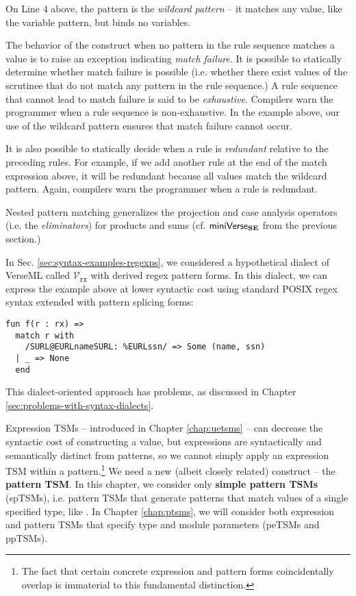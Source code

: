 On Line 4 above, the pattern \li{_} is the \emph{wildcard pattern} -- it matches any value, like the variable pattern, but binds no variables.

The behavior of the  construct when no pattern in the rule sequence matches a value is to raise an exception indicating \emph{match failure}. It is possible to statically determine whether match failure is possible (i.e. whether there exist values of the scrutinee that do not match any pattern in the rule sequence.) A rule sequence that cannot lead to match failure is said to be \emph{exhaustive}. Compilers warn the programmer when a rule sequence is non-exhaustive. In the example above, our use of the wildcard pattern ensures that match failure cannot occur. 

It is also possible to statically decide when a rule is \emph{redundant} relative to the preceding rules. For example, if we add  another rule at the end of the match expression above, it will be redundant because all values match the wildcard pattern. Again, compilers warn the programmer when a rule is redundant.

Nested pattern matching generalizes the projection and case analysis operators (i.e. the \emph{eliminators}) for products and sums (cf. $\mathsf{miniVerse}_\textbf{SE}$ from the previous section.) 

In Sec. \ref{sec:syntax-examples-regexps}, we considered a hypothetical dialect of VerseML called $\mathcal{V}_\texttt{rx}$ with derived regex pattern forms. In this dialect, we can express the example above at lower syntactic cost using standard POSIX regex syntax extended with pattern splicing forms:

\begin{lstlisting}
fun f(r : rx) => 
  match r with 
    /SURL@EURLnameSURL: %EURLssn/ => Some (name, ssn)
  | _ => None
  end
\end{lstlisting}
\noindent
This dialect-oriented approach has problems, as  discussed in Chapter \ref{sec:problems-with-syntax-dialects}.


Expression TSMs -- introduced in Chapter \ref{chap:uetsms} -- can decrease the syntactic cost of constructing a value, but expressions are syntactically and semantically distinct from patterns, so we cannot simply apply an expression TSM within a pattern.\footnote{The fact that certain concrete expression and pattern forms coincidentally overlap is immaterial to this fundamental distinction.} %
We need a new (albeit closely related) construct -- the \textbf{pattern TSM}. In this chapter, we consider only \textbf{simple pattern TSMs} (spTSMs), i.e. pattern TSMs that generate patterns that match values of a single specified type, like . In Chapter \ref{chap:ptsms}, we will consider both expression and pattern TSMs that specify type and module parameters (peTSMs and ppTSMs). 

